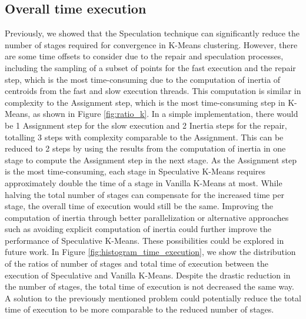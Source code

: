 \subsection{Overall time execution}

Previously, we showed that the Speculation technique can significantly reduce the number of stages required for convergence in K-Means clustering. However, there are some time offsets to consider due to the repair and speculation processes, including the sampling of a subset of points for the fast execution and the repair step, which is the most time-consuming due to the computation of inertia of centroids from the fast and slow execution threads. This computation is similar in complexity to the Assignment step, which is the most time-consuming step in K-Means, as shown in Figure \ref{fig:ratio_k}.
In a simple implementation, there would be 1 Assignment step for the slow execution and 2 Inertia steps for the repair, totalling 3 steps with complexity comparable to the Assignment. This can be reduced to 2 steps by using the results from the computation of inertia in one stage to compute the Assignment step in the next stage.
As the Assignment step is the most time-consuming, each stage in Speculative K-Means requires approximately double the time of a stage in Vanilla K-Means at most. While halving the total number of stages can compensate for the increased time per stage, the overall time of execution would still be the same. Improving the computation of inertia through better parallelization or alternative approaches such as avoiding explicit computation of inertia could further improve the performance of Speculative K-Means. These possibilities could be explored in future work.
In Figure \ref{fig:histogram_time_execution}, we show the distribution of the ratios of number of stages and total time of execution between the execution of Speculative and Vanilla K-Means. Despite the drastic reduction in the number of stages, the total time of execution is not decreased the same way. A solution to the previously mentioned problem could potentially reduce the total time of execution to be more comparable to the reduced number of stages.

